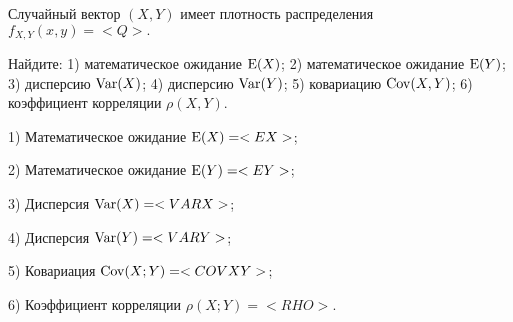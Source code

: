 \documentclass{article}%
\begin{document}
\begin{problem}
Случайный вектор $(X,Y)$
имеет плотность распределения
$
f_{X,Y}(x,y)=<Q>.\quad
$

Найдите:
1) математическое ожидание $\operatorname{E}(X)$;
2) математическое ожидание $\operatorname{E}(Y)$;
3) дисперсию $\operatorname{Var}(X)$;
4) дисперсию $\operatorname{Var}(Y)$;
5) ковариацию $\operatorname{Cov}(X,Y)$;
6) коэффициент корреляции $\rho(X,Y)$.
\end{problem}

\begin{solution*}
1) Математическое ожидание $\operatorname{E}(X) = <EX>$;

2) Математическое ожидание $\operatorname{E}(Y) = <EY>$;

3) Дисперсия $\operatorname{Var}(X) = <VARX>$;

4) Дисперсия $\operatorname{Var}(Y) = <VARY>$;

5) Ковариация $\operatorname{Cov}(X;Y)= <COVXY>$;

6) Коэффициент корреляции $\rho(X;Y)  = <RHO>$.
\end{solution*}
\end{document}
